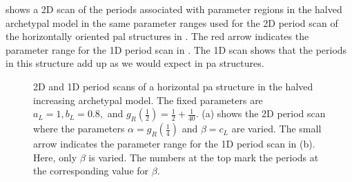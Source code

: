  shows a 2D scan of the periods associated with parameter regions in the halved archetypal model in the same parameter ranges used for the 2D period scan of the horizontally oriented \gls{pal} structures in .
The red arrow indicates the parameter range for the 1D period scan in .
The 1D scan shows that the periods in this structure add up as we would expect in \gls{pa} structures.

\begin{figure}
	\centering
	\caption[2D and 1D period scans of a horizontal period-adding structure in the halved increasing archetypal model]{
		2D and 1D period scans of a horizontal \gls{pa} structure in the halved increasing archetypal model.
		The fixed parameters are $a_L = 1, b_L = 0.8,$ and $g_R\left(\frac{1}{2}\right) = \frac{1}{2} + \frac{1}{40}$.
		(a) shows the 2D period scan where the parameters $\alpha = g_R\left(\frac{1}{4}\right)$ and $\beta = c_L$ are varied.
		The small arrow indicates the parameter range for the 1D period scan in (b).
		Here, only $\beta$ is varied.
		The numbers at the top mark the periods at the corresponding value for $\beta$.
	}
	\label{fig:add.add.halved.hor}
\end{figure}

